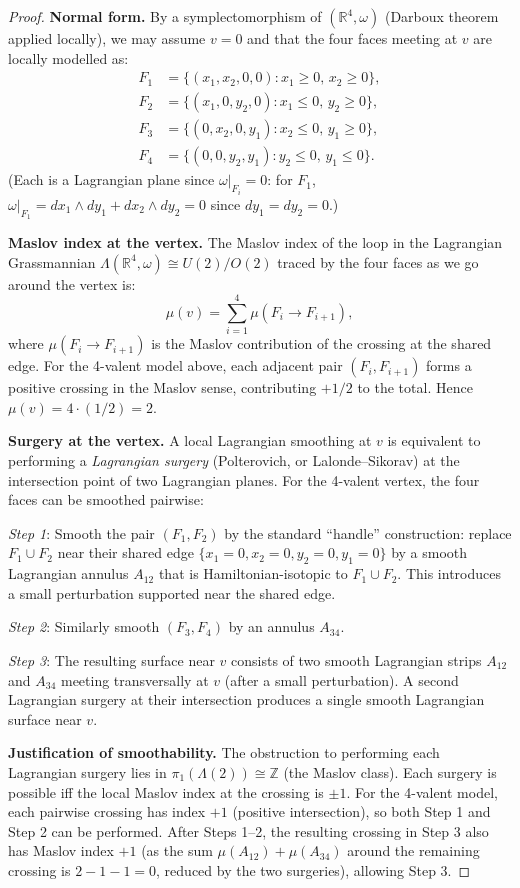 \documentclass[12pt]{article}
\theoremstyle{definition}
\theoremstyle{remark}
\newcommand{\bR}{\mathbb{R}}
\newcommand{\om}{\omega}
\begin{document}
\begin{proof}
\textbf{Normal form.}
By a symplectomorphism of $(\bR^4,\om)$ (Darboux theorem applied locally),
we may assume $v = 0$ and that the four faces meeting at $v$ are locally
modelled as:
\begin{align*}
  F_1 &= \{(x_1,x_2,0,0) : x_1\geq 0,\, x_2\geq 0\}, \\
  F_2 &= \{(x_1,0,y_2,0) : x_1\leq 0,\, y_2\geq 0\}, \\
  F_3 &= \{(0,x_2,0,y_1) : x_2\leq 0,\, y_1\geq 0\}, \\
  F_4 &= \{(0,0,y_2,y_1) : y_2\leq 0,\, y_1\leq 0\}.
\end{align*}
(Each is a Lagrangian plane since $\om|_{F_i} = 0$: for $F_1$,
$\om|_{F_1} = dx_1\wedge dy_1 + dx_2\wedge dy_2 = 0$ since $dy_1=dy_2=0$.)

\textbf{Maslov index at the vertex.}
The Maslov index of the loop in the Lagrangian Grassmannian
$\Lambda(\bR^4, \om) \cong U(2)/O(2)$ traced by the four faces as we go
around the vertex is:
\[
  \mu(v) = \sum_{i=1}^4 \mu(F_i \to F_{i+1}),
\]
where $\mu(F_i\to F_{i+1})$ is the Maslov contribution of the crossing
at the shared edge.  For the 4-valent model above, each adjacent pair
$(F_i, F_{i+1})$ forms a positive crossing in the Maslov sense, contributing
$+1/2$ to the total.  Hence $\mu(v) = 4\cdot(1/2) = 2$.

\textbf{Surgery at the vertex.}
A local Lagrangian smoothing at $v$ is equivalent to performing a
\emph{Lagrangian surgery} (Polterovich, or Lalonde--Sikorav) at the
intersection point of two Lagrangian planes.  For the 4-valent vertex,
the four faces can be smoothed pairwise:

\medskip
\noindent\textit{Step 1}: Smooth the pair $(F_1,F_2)$ by the standard
``handle'' construction: replace $F_1\cup F_2$ near their shared edge
$\{x_1=0, x_2=0, y_2=0, y_1=0\}$ by a smooth Lagrangian annulus
$A_{12}$ that is Hamiltonian-isotopic to $F_1\cup F_2$.  This introduces
a small perturbation supported near the shared edge.

\noindent\textit{Step 2}: Similarly smooth $(F_3,F_4)$ by an annulus $A_{34}$.

\noindent\textit{Step 3}: The resulting surface near $v$ consists of two
smooth Lagrangian strips $A_{12}$ and $A_{34}$ meeting transversally at
$v$ (after a small perturbation).  A second Lagrangian surgery at their
intersection produces a single smooth Lagrangian surface near $v$.

\textbf{Justification of smoothability.}
The obstruction to performing each Lagrangian surgery lies in $\pi_1(\Lambda(2))
\cong \mathbb{Z}$ (the Maslov class).  Each surgery is possible iff the local
Maslov index at the crossing is $\pm 1$.  For the 4-valent model, each
pairwise crossing has index $+1$ (positive intersection), so both Step 1 and
Step 2 can be performed.  After Steps 1--2, the resulting crossing in Step 3
also has Maslov index $+1$ (as the sum $\mu(A_{12}) + \mu(A_{34})$ around
the remaining crossing is $2 - 1 - 1 = 0$, reduced by the two surgeries),
allowing Step 3.


\end{proof}
\end{document}
